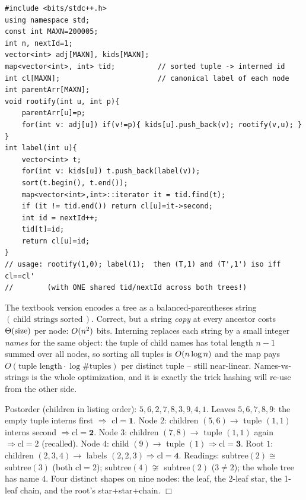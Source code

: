 \begin{lstlisting}[caption={The interned-tuple labeller: one postorder DFS fills cl[1..n] for a rooted tree; comparing two trees (or two subtrees) is one integer compare. ASCII only, identifiers without underscores}, label={lst:c22-ahu}]
#include <bits/stdc++.h>
using namespace std;
const int MAXN=200005;
int n, nextId=1;
vector<int> adj[MAXN], kids[MAXN];
map<vector<int>, int> tid;          // sorted tuple -> interned id
int cl[MAXN];                       // canonical label of each node
int parentArr[MAXN];
void rootify(int u, int p){
    parentArr[u]=p;
    for(int v: adj[u]) if(v!=p){ kids[u].push_back(v); rootify(v,u); }
}
int label(int u){
    vector<int> t;
    for(int v: kids[u]) t.push_back(label(v));
    sort(t.begin(), t.end());
    map<vector<int>,int>::iterator it = tid.find(t);
    if (it != tid.end()) return cl[u]=it->second;
    int id = nextId++;
    tid[t]=id;
    return cl[u]=id;
}
// usage: rootify(1,0); label(1);  then (T,1) and (T',1') iso iff cl==cl'
//        (with ONE shared tid/nextId across both trees!)
\end{lstlisting}

\begin{insightbox}
The textbook version encodes a tree as a balanced-parentheses string
\((\,\text{child strings sorted}\,)\).  Correct, but a string \emph{copy} at every
ancestor costs \(\Theta(\operatorname{size})\) per node: \(O(n^2)\) bits.  Interning replaces
each string by a small integer \emph{names} for the same object: the tuple of
child names has total length \(n-1\) summed over all nodes, so sorting all tuples
is \(O(n\log n)\) and the map pays \(O(\text{tuple length}\cdot\log\#\text{tuples})\)
per distinct tuple -- still near-linear.  Names-vs-strings is the whole
optimization, and it is exactly the trick hashing will re-use from the other side.
\end{insightbox}

\begin{tracebox}
Postorder (children in listing order): \(5,6,2,7,8,3,9,4,1\).
Leaves \(5,6,7,8,9\): the empty tuple interns first \(\Rightarrow\) \(\mathrm{cl}=\mathbf{1}\).
Node \(2\): children \((5,6)\to\) tuple \((1,1)\) interns second \(\Rightarrow\mathrm{cl}=\mathbf{2}\).
Node \(3\): children \((7,8)\to\) tuple \((1,1)\) again \(\Rightarrow\mathrm{cl}=2\) (recalled).
Node \(4\): child \((9)\to\) tuple \((1)\Rightarrow\mathrm{cl}=\mathbf{3}\).
Root \(1\): children \((2,3,4)\to\) labels \((2,2,3)\Rightarrow\mathrm{cl}=\mathbf{4}\).
Readings: subtree\((2)\cong\) subtree\((3)\) (both \(\mathrm{cl}=2\)); subtree\((4)\not\cong\)
subtree\((2)\) (\(3\ne2\)); the whole tree has name \(4\).  Four distinct shapes on
nine nodes: the leaf, the 2-leaf star, the 1-leaf chain, and the root's
star+star+chain. \(\Box\)
\end{tracebox}

